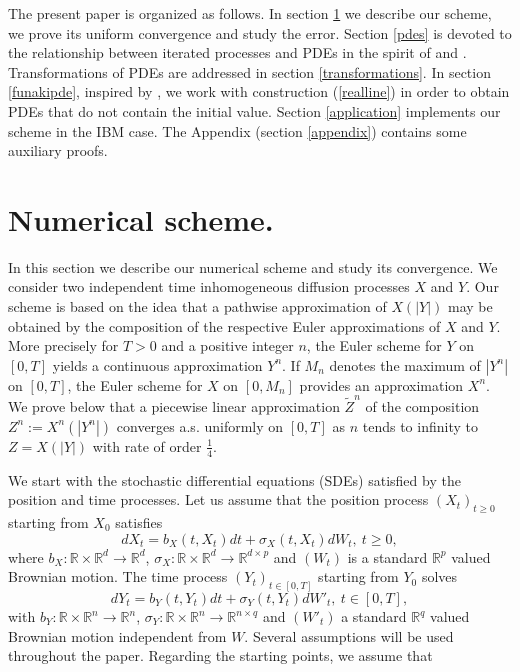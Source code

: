 \documentclass[a4paper, 11pt]{article}
\newcommand{\R}{\mathbb{R}}
\newcommand{\1}{\mathbf{1}}
\begin{document}
\noindent The present paper is organized as follows. In section \ref{algorithme} we describe our scheme, we prove its uniform convergence and study the error. Section \ref{pdes} is devoted to the relationship between iterated processes and PDEs in the spirit of \cite{allouba} and \cite{erkan}. Transformations of PDEs are addressed in section \ref{transformations}. In section \ref{funakipde}, inspired by \cite{funaki}, we work with construction (\ref{realline}) in order to obtain PDEs that do not contain the initial value. Section \ref{application} implements our scheme in the IBM case. The Appendix (section \ref{appendix}) contains some auxiliary proofs.





\section{Numerical scheme.}\label{algorithme}

\noindent In this section we describe our numerical scheme and study its convergence. We consider two independent time inhomogeneous diffusion processes $X$ and $Y$. Our scheme is based on the idea that a pathwise approximation of $X(|Y|)$ may be obtained by the composition of the respective Euler approximations of $X$ and $Y$. More precisely for $T>0$ and a positive integer $n$, the Euler scheme for $Y$ on $[0,T]$ yields a continuous approximation $Y^n$. If $M_n$ denotes the maximum of $|Y^n|$ on $[0,T]$, the Euler scheme for $X$ on $[0,M_n]$ provides an approximation $X^n$. We prove below that a piecewise linear approximation $\tilde{Z}^n$ of the composition $Z^n:=X^n(|Y^n|)$ converges a.s. uniformly on $[0,T]$ as $n$ tends to infinity to $Z=X(|Y|)$ with rate of order $\frac{1}{4}$. 

\smallskip

\noindent We start with the stochastic differential equations (SDEs) satisfied by the position and time processes. Let us assume that the position process $(X_t)_{t\geq 0}$ starting from $X_0$ satisfies 
\begin{equation}
\label{edsX}
dX_t=b_X(t,X_t)dt+\sigma_X(t,X_t)dW_t, \ t\geq 0,
\end{equation}
where $b_X: \R \times \R^d \rightarrow \R^d$, $\sigma_X: \R \times \R^d \rightarrow \R^{d\times p}$ and $(W_t)$ is a standard $\R^p$ valued Brownian motion. The time process $(Y_t)_{t\in [0,T]}$ starting from $Y_0$ solves
\begin{equation}
\label{edsY}
dY_t=b_Y(t,Y_t)dt+\sigma_Y(t,Y_t)dW'_t, \ t\in[0,T],
\end{equation}
with $b_Y: \R \times \R^n \rightarrow \R^n$, $\sigma_Y: \R \times \R^n \rightarrow \R^{n\times q}$ and $(W'_t)$ a standard $\R^q$ valued Brownian motion independent from $W$. Several assumptions will be used throughout the paper. Regarding the starting points, we assume that
\end{document}
